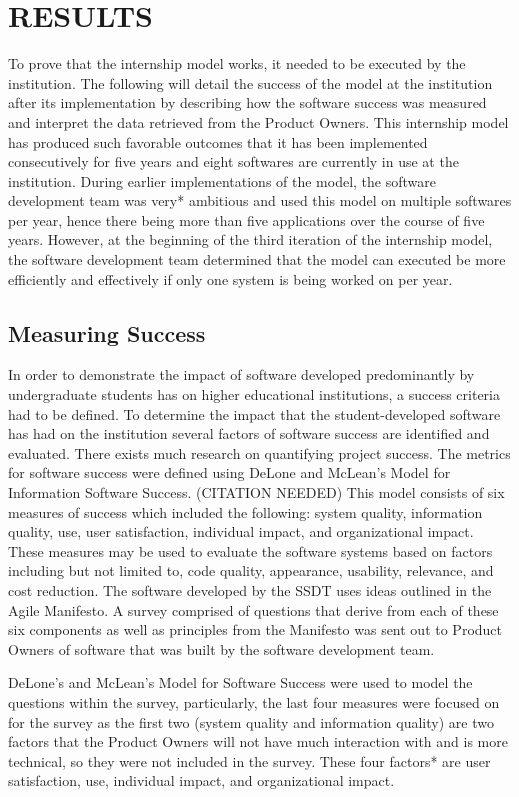 \section{RESULTS}
To prove that the internship model works, it needed to be executed by the institution. The following will detail the success of the model at the institution after its implementation by describing how the software success was measured and interpret the data retrieved from the Product Owners.
This internship model has produced such favorable outcomes that it has been implemented consecutively for five years and eight softwares are currently in use at the institution. During earlier implementations of the model, the software development team was very* ambitious and used this model on multiple softwares per year, hence there being more than five applications over the course of five years. However, at the beginning of the third iteration of the internship model, the software development team determined that the model can executed be more efficiently and effectively if only one system is being worked on per year.

\subsection{Measuring Success}
In order to demonstrate the impact of software developed predominantly by undergraduate students has on higher educational institutions, a success criteria had to be defined. To determine the impact that the student-developed software has had on the institution several factors of software success are identified and evaluated.  There exists much research on quantifying project success. The metrics for software success were defined using DeLone and McLean’s Model for Information Software Success. (CITATION NEEDED) This model consists of six measures of success which included the following: system quality, information quality, use, user satisfaction, individual impact, and organizational impact. These measures may be used to evaluate the software systems based on factors including but not limited to, code quality, appearance, usability, relevance, and cost reduction. The software developed by the SSDT uses ideas outlined in the Agile Manifesto. A survey comprised of questions that derive from each of these six components as well as principles from the Manifesto was sent out to Product Owners of software that was built by the software development team.

DeLone's and McLean's Model for Software Success were used to model the questions within the survey, particularly, the last four measures were focused on for the survey as the first two (system quality and information quality) are two factors that the Product Owners will not have much interaction with and is more technical, so they were not included in the survey. These four factors* are user satisfaction, use, individual impact, and organizational impact.

